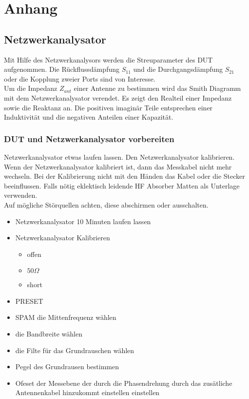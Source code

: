 \chapter{Anhang}
\section{ Netzwerkanalysator }
Mit Hilfe des Netzwerkanalysors werden die Streuparameter des DUT aufgenommen. Die Rückflussdämpfung $S_{11}$ und die Durchgangsdämpfung $S_{21}$ oder die Kopplung zweier Ports sind  von Interesse.\\
Um die Impedanz $Z_{ant}$ einer Antenne zu bestimmen wird das Smith Diagramm mit dem Netzwerkanalysator verendet. Es zeigt den Realteil einer Impedanz sowie die Reaktanz an. Die positiven imaginär Teile entsprechen einer Induktivität  und die negativen Anteilen einer Kapazität.
	
	\subsection{DUT und Netzwerkanalysator vorbereiten}
	Netzwerkanalysator etwas laufen lassen. Den Netzwerkanalysator kalibrieren.  Wenn der Netzwerkanalysator kalibriert ist, dann das Messkabel nicht mehr wechseln. Bei der Kalibrierung nicht mit den Händen das Kabel oder die Stecker beeinflussen. Falls nötig eklektisch leidende HF Absorber Matten als Unterlage verwenden. \\
	Auf mögliche Störquellen achten, diese abschirmen oder ausschalten.
	\begin{itemize}
	\item Netzwerkanalysator 10 Minuten laufen lassen
	\item Netzwerkanalysator Kalibrieren
	\begin{itemize}
	\item offen
	\item $50\Omega$
	\item short
	\end{itemize}

	\item PRESET
	\item SPAM die Mittenfrequenz wählen
	\item die Bandbreite wählen
	\item die Filte für das Grundrauschen wählen
	\item Pegel des Grundrausen bestimmen
		\item Ofeset der Messebene  der durch die Phasendrehung durch das zusätliche Antennenkabel hinzukommt einstellen einstellen
	\end{itemize}
	
